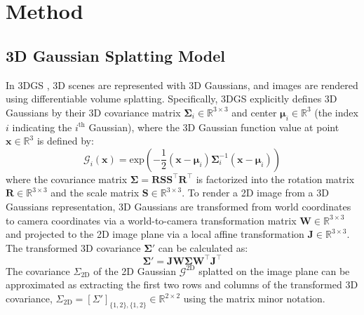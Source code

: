 
\newcommand{\first}[1]{{\textbf{#1}}}
\newcommand{\second}[1]{{\underline{#1}}}
\newcommand{\third}[1]{#1}

\section{Method}


\subsection{3D Gaussian Splatting Model}
In 3DGS \cite{kerbl3Dgaussians}, 3D scenes are represented with 3D Gaussians, and images are rendered using differentiable volume splatting. Specifically, 3DGS explicitly defines 3D Gaussians by their 3D covariance matrix $\mathbf{\Sigma}_i \in \mathbb{R}^{3\times3} $ and center $\bm{\mu}_i \in \mathbb{R}^3$ (the index $i$ indicating the $i^\text{th}$ Gaussian), where the 3D Gaussian function value at point $\mathbf{x}\in \mathbb{R}^{3}$ is defined by:
\begin{equation}
    \mathcal{G}_i(\mathbf{x}) = \text{exp}(-\frac{1}{2}(\mathbf{x} - \bm{\mu}_i)\mathbf{\Sigma}_i^{-1}(\mathbf{x} - \bm{\mu}_i))
\end{equation}
where the covariance matrix $\mathbf{\Sigma} = \mathbf{R}\mathbf{S}\mathbf{S}^\top\mathbf{R}^\top$ is factorized into the rotation matrix $\mathbf{R} \in \mathbb{R}^{3\times3}$ and the scale matrix $\mathbf{S} \in \mathbb{R}^{3\times3}$. To render a 2D image from a 3D Gaussians representation, 3D Gaussians are transformed from world coordinates to camera coordinates via a world-to-camera transformation matrix $\mathbf{W} \in \mathbb{R}^{3\times3} $ and projected to the 2D image plane via a local affine transformation $\mathbf{J} \in \mathbb{R}^{3\times3} $. The transformed 3D covariance $\mathbf{\Sigma}'$ can be calculated as:
\begin{equation}
    \mathbf{\Sigma}' = \mathbf{J}\mathbf{W}\mathbf{\Sigma}\mathbf{W}^\top\mathbf{J}^\top
\end{equation}
The covariance $\Sigma_\text{2D}$ of the 2D Gaussian $\mathcal{G}^\text{2D}$ splatted on the image plane can be approximated as extracting the first two rows and columns of the transformed 3D covariance, $\Sigma_\text{2D} = [\Sigma']_{\{1,2\}, \{1,2\}} \in \mathbb{R}^{2\times2} $ using the matrix minor notation.

